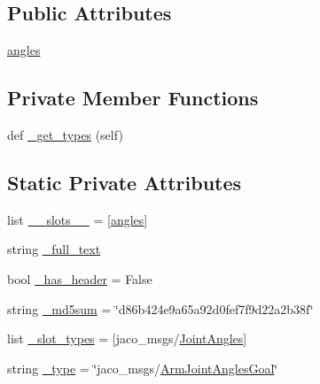 \subsection*{Public Attributes}
\begin{DoxyCompactItemize}
\item 
\hyperlink{classjaco__msgs_1_1msg_1_1__ArmJointAnglesGoal_1_1ArmJointAnglesGoal_a1627be30233ae9ff8861c8cc8fbd9566}{angles}
\end{DoxyCompactItemize}
\subsection*{Private Member Functions}
\begin{DoxyCompactItemize}
\item 
def \hyperlink{classjaco__msgs_1_1msg_1_1__ArmJointAnglesGoal_1_1ArmJointAnglesGoal_af6db15b981c92f9c96d5d8852d1fb106}{\+\_\+get\+\_\+types} (self)
\end{DoxyCompactItemize}
\subsection*{Static Private Attributes}
\begin{DoxyCompactItemize}
\item 
list \hyperlink{classjaco__msgs_1_1msg_1_1__ArmJointAnglesGoal_1_1ArmJointAnglesGoal_a8037c3571ce9ed701a29bf75e42678be}{\+\_\+\+\_\+slots\+\_\+\+\_\+} = \mbox{[}\textquotesingle{}\hyperlink{classjaco__msgs_1_1msg_1_1__ArmJointAnglesGoal_1_1ArmJointAnglesGoal_a1627be30233ae9ff8861c8cc8fbd9566}{angles}\textquotesingle{}\mbox{]}
\item 
string \hyperlink{classjaco__msgs_1_1msg_1_1__ArmJointAnglesGoal_1_1ArmJointAnglesGoal_a68bf6039ae90de6ae75801de4e62f09c}{\+\_\+full\+\_\+text}
\item 
bool \hyperlink{classjaco__msgs_1_1msg_1_1__ArmJointAnglesGoal_1_1ArmJointAnglesGoal_ae685981df0cf1133e524c1655a9de395}{\+\_\+has\+\_\+header} = False
\item 
string \hyperlink{classjaco__msgs_1_1msg_1_1__ArmJointAnglesGoal_1_1ArmJointAnglesGoal_aae1f0998347dddbf0f267b7828ad54b0}{\+\_\+md5sum} = \char`\"{}d86b424e9a65a92d0fef7f9d22a2b38f\char`\"{}
\item 
list \hyperlink{classjaco__msgs_1_1msg_1_1__ArmJointAnglesGoal_1_1ArmJointAnglesGoal_aa912dcbcfd9ff6369f92542ac2eac10c}{\+\_\+slot\+\_\+types} = \mbox{[}\textquotesingle{}jaco\+\_\+msgs/\hyperlink{classjaco__msgs_1_1msg_1_1__JointAngles_1_1JointAngles}{Joint\+Angles}\textquotesingle{}\mbox{]}
\item 
string \hyperlink{classjaco__msgs_1_1msg_1_1__ArmJointAnglesGoal_1_1ArmJointAnglesGoal_ae20948d5404deee4755fcebb6a6a6d21}{\+\_\+type} = \char`\"{}jaco\+\_\+msgs/\hyperlink{classjaco__msgs_1_1msg_1_1__ArmJointAnglesGoal_1_1ArmJointAnglesGoal}{Arm\+Joint\+Angles\+Goal}\char`\"{}
\end{DoxyCompactItemize}


